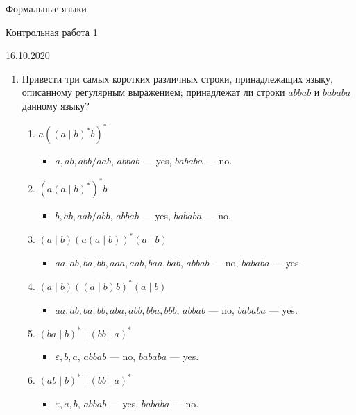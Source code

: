 \documentclass[12pt]{article}
\begin{document}
\begin{center}
{\LARGE Формальные языки}

{\Large Контрольная работа 1}

{\large 16.10.2020}
\end{center}

\bigskip


\begin{enumerate}
\setlength\itemsep{1em}

  \item Привести три самых коротких различных строки, принадлежащих языку, описанному регулярным выражением; принадлежат ли строки $abbab$ и $bababa$ данному языку?
  \begin{enumerate}[label=\arabic*)]
    \setlength\itemsep{0.8em}
    \item $a ((a \mid b)^* b)^* $
    \begin{itemize}
      \item $a, ab, abb/aab$, $abbab$ --- yes, $bababa$ --- no.
    \end{itemize}
    \item $(a (a \mid b)^*)^* b $
    \begin{itemize}
      \item $b, ab, aab/abb$, $abbab$ --- yes, $bababa$ --- no.
    \end{itemize}
    \item $(a \mid b) (a (a \mid b))^* (a \mid b) $
    \begin{itemize}
      \item $aa, ab, ba, bb, aaa, aab, baa, bab$, $abbab$ --- no, $bababa$ --- yes.
    \end{itemize}
    \item $(a \mid b) ((a \mid b) b)^* (a \mid b) $
    \begin{itemize}
      \item $aa, ab, ba, bb, aba, abb, bba, bbb$, $abbab$ --- no, $bababa$ --- yes.
    \end{itemize}
    \item $(ba \mid b)^* \mid (bb \mid a)^*$
    \begin{itemize}
      \item $\varepsilon, b, a$, $abbab$ --- no, $bababa$ --- yes.
    \end{itemize}
    \item $(ab \mid b)^* \mid (bb \mid a)^*$
    \begin{itemize}
      \item $\varepsilon, a, b$, $abbab$ --- yes, $bababa$ --- no.

\end{itemize}
\end{enumerate}
\end{enumerate}
\end{document}
